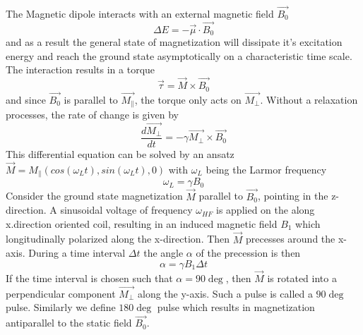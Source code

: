 \vspace{3mm} \\
The Magnetic dipole interacts with an external magnetic field $\vec{B_{0}}$ 
\begin{equation}
	\label{5}
	\Delta E = - \vec{\mu}\cdot \vec{B_{0}}
\end{equation}
and as a result the general state of magnetization will dissipate it's excitation energy and reach the ground state asymptotically on a characteristic time scale.
\vspace{5mm} \\
The interaction results in a torque
\begin{equation}
	\label{6}
	\vec{\tau} = \vec{M} \times \vec{B_{0}}
\end{equation}
and since $\vec{B_{0}}$ is parallel to $\vec{M_{\parallel}}$, the torque only acts on $\vec{M_{\perp}}$. Without a relaxation processes, the rate of change is given by
\begin{equation}
	\label{7}
	\dfrac{d\vec{M_{\perp}}}{dt} = - \gamma \vec{M_{\perp}} \times \vec{B_{0}}
\end{equation}
This differential equation can be solved by an ansatz $\vec{M} = M_{\parallel}(cos(\omega_{L} t),sin(\omega_{L} t),0)$ with $\omega_{L}$ being the Larmor frequency 
\begin{equation}
	\label{8}
	\omega_{L} = \gamma B_{0}
\end{equation}
Consider the ground state magnetization $\vec{M}$ parallel to $\vec{B_{0}}$, pointing in the z-direction. A sinusoidal voltage of frequency $\omega_{HF}$ is applied on the along x.direction oriented coil, resulting in an induced magnetic field $B_{1}$ which longitudinally polarized along the x-direction. Then $\vec{M}$ precesses around the x-axis. During a time interval $\Delta t$ the angle $\alpha$ of the precession is then 
\begin{equation}
	\label{9}
	\alpha = \gamma B_{1} \Delta t
\end{equation}
If the time interval is chosen such that $\alpha = 90 \deg$, then $\vec{M}$ is rotated into a perpendicular component $\vec{M_{\perp}}$ along the y-axis. Such a pulse is called a $90 \deg$ pulse. Similarly we define $180 \deg$ pulse which results in magnetization antiparallel to the static field $\vec{B_{0}}$.
\vspace{4mm}\\
